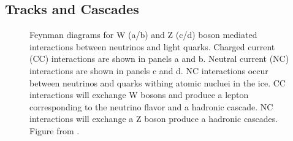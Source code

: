 \subsection{Tracks and Cascades}

\begin{figure}
    \caption{Feynman diagrams for W (a/b) and Z (c/d) boson mediated interactions between neutrinos and light quarks. Charged current (CC) interactions are shown in panels a and b. Neutral current (NC) interactions are shown in panels c and d. NC interactions occur between neutrinos and quarks withing atomic nucluei in the ice. CC interactions will exchange W bosons and produce a lepton corresponding to the neutrino flavor and a hadronic cascade. NC interactions will exchange a Z boson produce a hadronic cascades. Figure from \cite{physics_withIC3}.}
    \label{fig:ic2_ccORnc}
\end{figure}

